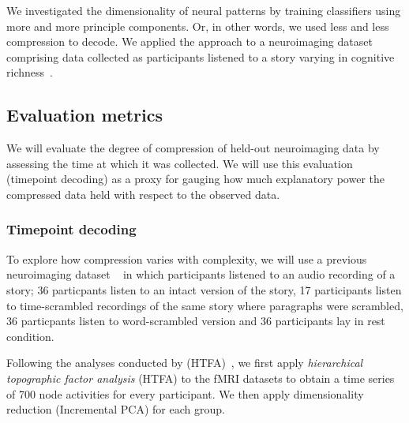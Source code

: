 \documentclass[english]{article}
\begin{document}
We investigated the dimensionality of neural patterns by training
classifiers using more and more principle components. Or, in other
words, we used less and less compression to decode.
We applied the approach to
a neuroimaging dataset comprising data collected as participants
listened to a story varying in cognitive richness~\citep{SimoEtal16}.






\subsection*{Evaluation metrics}
 We will evaluate the degree of
compression of held-out
neuroimaging data by assessing the time at which it was collected.  We will use this evaluation (timepoint
decoding) as a proxy for
gauging how much explanatory power the compressed data held
with respect to the observed data.



\subsubsection*{Timepoint decoding}

To explore how compression varies with complexity, we will use a previous neuroimaging dataset
~\cite{SimoEtal16}  in which participants listened to an audio recording of a story; 36 particpants listen to an intact version of the story, 17 participants listen to time-scrambled recordings of the same story where paragraphs were scrambled, 36 particpants listen to word-scrambled version and 36 participants lay in rest condition.


Following the analyses conducted by (HTFA)~\cite{MannEtal18}, we first
apply \textit{hierarchical topographic factor analysis} (HTFA) to
the fMRI datasets to obtain a time series of 700 node activities for
every participant.  We then apply dimensionality reduction
(Incremental PCA) for each group.
\end{document}
